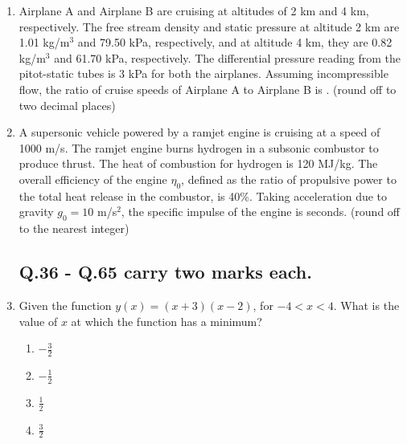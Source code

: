 \documentclass{article}
\begin{document}
\begin{enumerate}[leftmargin=*, resume]
\item Airplane A and Airplane B are cruising at altitudes of 2 km and 4 km, respectively. The free stream density and static pressure at altitude 2 km are 1.01 kg/m$^3$ and 79.50 kPa, respectively, and at altitude 4 km, they are 0.82 kg/m$^3$ and 61.70 kPa, respectively. The differential pressure reading from the pitot-static tubes is 3 kPa for both the airplanes. Assuming incompressible flow, the ratio of cruise speeds of Airplane A to Airplane B is \underline{\hspace{1.5cm}}. (round off to two decimal places)

\item A supersonic vehicle powered by a ramjet engine is cruising at a speed of 1000 m/s. The ramjet engine burns hydrogen in a subsonic combustor to produce thrust. The heat of combustion for hydrogen is 120 MJ/kg. The overall efficiency of the engine $\eta_0$, defined as the ratio of propulsive power to the total heat release in the combustor, is 40\%. Taking acceleration due to gravity $g_0 = 10$ m/s$^2$, the specific impulse of the engine is \underline{\hspace{1.5cm}} seconds. (round off to the nearest integer)

\subsection*{Q.36 - Q.65 carry two marks each.}

\item Given the function $y(x) = (x + 3)(x - 2)$, for $-4 < x < 4$. What is the value of $x$ at which the function has a minimum?
\begin{multicols}{4}
\begin{enumerate}
\item $-\frac{3}{2}$
\item $-\frac{1}{2}$
\item $\frac{1}{2}$
\item $\frac{3}{2}$
\end{enumerate}
\end{multicols}


\end{enumerate}
\end{document}
